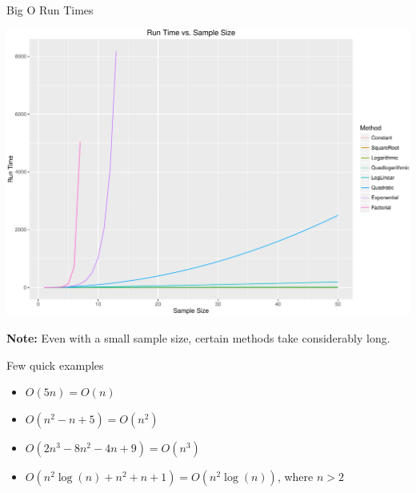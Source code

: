 \begin{frame}{Big O Run Times}

\includegraphics{lec4_grouping_big_oh_control_statements_files/figure-beamer/big_o_runtime-1.pdf}

\textbf{Note:} Even with a small sample size, certain methods take
considerably long.

\end{frame}

\begin{frame}{Few quick examples}

\begin{itemize}
\tightlist
\item
  \(O(5n) = O(n)\)
\item
  \(O(n^2 - n + 5) = O(n^2)\)
\item
  \(O(2n^3 - 8n^2 - 4n + 9) = O(n^3)\)
\item
  \(O(n^2\log(n) + n^2 + n + 1) = O(n^2\log(n))\), where \(n > 2\)
\end{itemize}

\end{frame}

